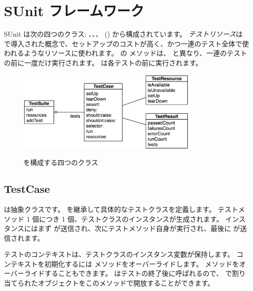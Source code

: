 \documentclass[a4paper,10pt,twoside]{book}
\begin{document}

\section{SUnit フレームワーク}

SUnit は次の四つのクラス:
、、、 () から構成されています。
\emph{テストリソース}は  で導入された概念で、セットアップのコストが高く、かつ一連のテスト全体で使われるようなリソースに使われます。
 の  メソッドは、 と異なり、一連のテストの前に一度だけ実行されます。
 は各テストの前に実行されます。

\begin{figure}[htb]
  \begin{center}
		{\includegraphics[width=0.8\textwidth]{sunit-classes}}
	\caption{\SUnit を構成する四つのクラス}
  \end{center}
\end{figure}

\subsection{TestCase}

 は抽象クラスです。 を継承して具体的なテストクラスを定義します。
テストメソッド 1 個につき 1 個、テストクラスのインスタンスが生成されます。
インスタンスにはまず が送信され、次にテストメソッド自身が実行され、最後に  が送信されます。

テストのコンテキストは、テストクラスのインスタンス変数が保持します。
コンテキストを初期化するには  メソッドをオーバーライドします。
 メソッドをオーバーライドすることもできます。 はテストの終了後に呼ばれるので、 で割り当てられたオブジェクトをこのメソッドで開放することができます。
\end{document}

